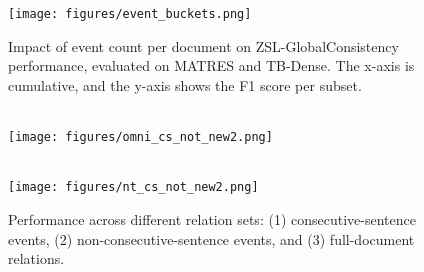 \begin{figure}[t!]
    \centering
    \texttt{[image: figures/event\_buckets.png]}
    \caption{Impact of event count per document on ZSL-GlobalConsistency performance, evaluated on MATRES and TB-Dense. The x-axis is cumulative, and the y-axis shows the F1 score per subset.}
    \label{fig:event-buckets}
\end{figure}


\begin{figure}[t]
    \centering

    \parbox{\linewidth}{ %
         \\ %
        \texttt{[image: figures/omni\_cs\_not\_new2.png]}
    }

    \vspace{0.5cm} %

    \parbox{\linewidth}{
         \\ %
        \texttt{[image: figures/nt\_cs\_not\_new2.png]}
    }

    \caption{Performance across different relation sets: (1) consecutive-sentence events, (2) non-consecutive-sentence events, and (3) full-document relations.}
    \label{fig:cs-sent-expr}
\end{figure}
